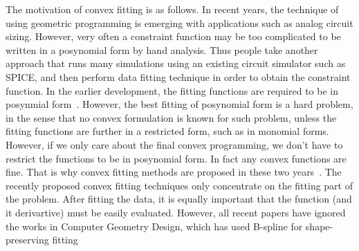 \documentclass[10pt,twocolumn]{article}          %
\begin{document}
\label{sec:intro}
The motivation of convex fitting is as follows. In recent years, the
technique of using geometric programming is emerging with applications such
as analog circuit sizing. However, very often a constraint function
may be too complicated to be written in a posynomial form by hand
analysis. Thus people take another approach that runs many simulations
using an existing circuit simulator such as SPICE, and then perform data
fitting technique in order to obtain the constraint function. In the
earlier development, the fitting functions are required to be in posynmial 
form~\cite{Daems_01,Daems_DAC_02,Daems_DATE_02,Daems_03,Kiely_04,LiXin_04}. 
However, the best fitting of posynomial form
is a hard problem, in the sense that no convex formulation is known
for such problem, unless the fitting functions are further in a
restricted form, such as in monomial forms.
%
However, if we only care about the final convex
programming, we don't have to restrict the functions to be in
posynomial form. In fact any convex functions are fine. 
That is why convex fitting methods are proposed in these two
years~\cite{Trac_05,Piecewise_06,Roy_05,Roy_06,SmartSmooth_07}. 
The recently proposed convex fitting techniques only
concentrate on the fitting part of the problem. After fitting the
data, it is equally important that the function (and it derivartive)
must be easily evaluated. However, all recent papers have ignored the
works in Computer 
Geometry Design, which has used B-spline for shape-preserving fitting
\end{document}
